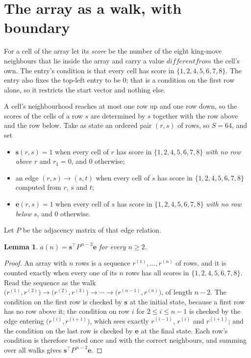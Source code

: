 \documentclass[11pt,a4paper]{article}
\theoremstyle{plain}
\newtheorem{lemma}[theorem]{Lemma}
\theoremstyle{definition}
\begin{document}
\section{The array as a walk, with boundary}

For a cell of the array let its \emph{score} be the number of the eight king-move neighbours that lie inside
the array and carry a value $different from$ the cell's own. The entry's condition is that every cell
has score in $\{1,2,4,5,6,7,8\}$. The entry also fixes the top-left entry to be $0$; that is a condition on the first row alone, so it restricts the start vector and nothing else.

A cell's neighbourhood reaches at most one row up and one row down, so the scores of the
cells of a row $s$ are determined by $s$ together with the row above and the row below.
Take as state an ordered pair $(r,s)$ of rows, so $S=64$, and set
\begin{itemize}
\item $\mathbf{s}(r,s)=1$ when every cell of $r$ has score in $\{1,2,4,5,6,7,8\}$ \emph{with no row
above $r$} and $r_1=0$, and $0$ otherwise;
\item an edge $(r,s)\to(s,t)$ when every cell of $s$ has score in $\{1,2,4,5,6,7,8\}$ computed from
$r$, $s$ and $t$;
\item $\mathbf{e}(r,s)=1$ when every cell of $s$ has score in $\{1,2,4,5,6,7,8\}$ \emph{with no row
below $s$}, and $0$ otherwise.
\end{itemize}
Let $P$ be the adjacency matrix of that edge relation.

\begin{lemma}\label{lem:walk}
$a(n)=\mathbf{s}^{\!\top}P^{\,n-2}\mathbf{e}$ for every $n\ge2$.
\end{lemma}

\begin{proof}
An array with $n$ rows is a sequence $r^{(1)},\dots,r^{(n)}$ of rows, and it is counted
exactly when every one of its $n$ rows has all scores in $\{1,2,4,5,6,7,8\}$. Read the sequence as the
walk $\bigl(r^{(1)},r^{(2)}\bigr)\to\bigl(r^{(2)},r^{(3)}\bigr)\to\cdots\to
\bigl(r^{(n-1)},r^{(n)}\bigr)$, of length $n-2$. The condition on the first row is
checked by $\mathbf{s}$ at the initial state, because a first row has no row above it; the
condition on row $i$ for $2\le i\le n-1$ is checked by the edge entering
$\bigl(r^{(i)},r^{(i+1)}\bigr)$, which sees exactly $r^{(i-1)}$, $r^{(i)}$ and
$r^{(i+1)}$; and the condition on the last row is checked by $\mathbf{e}$ at the final
state. Each row's condition is therefore tested once and with the correct neighbours, and
summing over all walks gives $\mathbf{s}^{\!\top}P^{\,n-2}\mathbf{e}$.
\end{proof}
\end{document}
